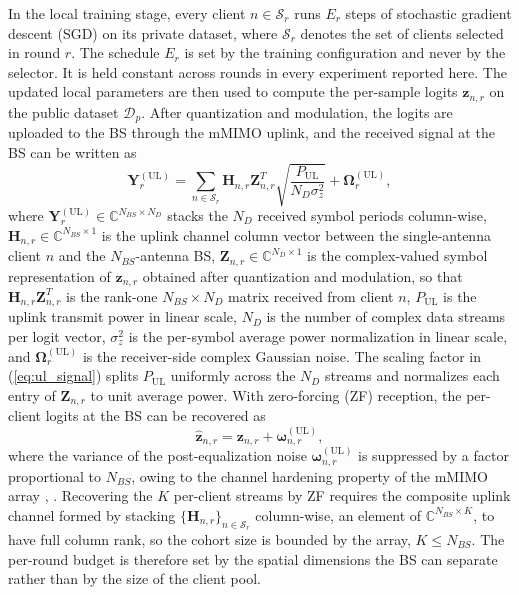 \documentclass[journal]{IEEEtran}
\newcommand{\rev}[1]{#1}
\begin{document}
In the local training stage, every client $n \in \mathcal{S}_r$ runs $E_r$ steps of stochastic gradient descent (SGD) on its private dataset, where $\mathcal{S}_r$ denotes the set of clients selected in round $r$. \rev{The schedule $E_r$ is set by the training configuration and never by the selector. It is held constant across rounds in every experiment reported here.} The updated local parameters are then used to compute the per-sample logits $\bm{z}_{n,r}$ on the public dataset $\mathcal{D}_p$. After quantization and modulation, the logits are uploaded to the BS through the mMIMO uplink, and the received signal at the BS can be written as
\begin{equation}
\bm{Y}^{(\text{UL})}_{r} = \sum_{n \in \mathcal{S}_r} \bm{H}_{n,r} \bm{Z}_{n,r}^{T} \sqrt{\frac{P_{\text{UL}}}{N_D \sigma_z^2}} + \bm{\Omega}^{(\text{UL})}_{r},
\label{eq:ul_signal}
\end{equation}
where $\bm{Y}^{(\text{UL})}_{r} \in \mathbb{C}^{N_{BS} \times N_D}$ stacks the $N_D$ received symbol periods column-wise, $\bm{H}_{n,r} \in \mathbb{C}^{N_{BS} \times 1}$ is the uplink channel column vector between the single-antenna client $n$ and the $N_{BS}$-antenna BS, $\bm{Z}_{n,r} \in \mathbb{C}^{N_D \times 1}$ is the complex-valued symbol representation of $\bm{z}_{n,r}$ obtained after quantization and modulation, so that $\bm{H}_{n,r}\bm{Z}_{n,r}^{T}$ is the rank-one $N_{BS}\times N_D$ matrix received from client $n$, $P_{\text{UL}}$ is the uplink transmit power in linear scale, $N_D$ is the number of complex data streams per logit vector, $\sigma_z^2$ is the per-symbol average power normalization in linear scale, and $\bm{\Omega}^{(\text{UL})}_{r}$ is the receiver-side complex Gaussian noise. The scaling factor in (\ref{eq:ul_signal}) splits $P_{\text{UL}}$ uniformly across the $N_D$ streams and normalizes each entry of $\bm{Z}_{n,r}$ to unit average power. With zero-forcing (ZF) reception, the per-client logits at the BS can be recovered as
\begin{equation}
\hat{\bm{z}}_{n,r} = \bm{z}_{n,r} + \bm{\omega}^{(\text{UL})}_{n,r},
\label{eq:ul_zf}
\end{equation}
where the variance of the post-equalization noise $\bm{\omega}^{(\text{UL})}_{n,r}$ is suppressed by a factor proportional to $N_{BS}$, owing to the channel hardening property of the mMIMO array \cite{mu2024fedtskd}, \cite{vu2020cell}. \rev{Recovering the $K$ per-client streams by ZF requires the composite uplink channel formed by stacking $\{\bm{H}_{n,r}\}_{n \in \mathcal{S}_r}$ column-wise, an element of $\mathbb{C}^{N_{BS} \times K}$, to have full column rank, so the cohort size is bounded by the array, $K \le N_{BS}$. The per-round budget is therefore set by the spatial dimensions the BS can separate rather than by the size of the client pool.}
\end{document}

